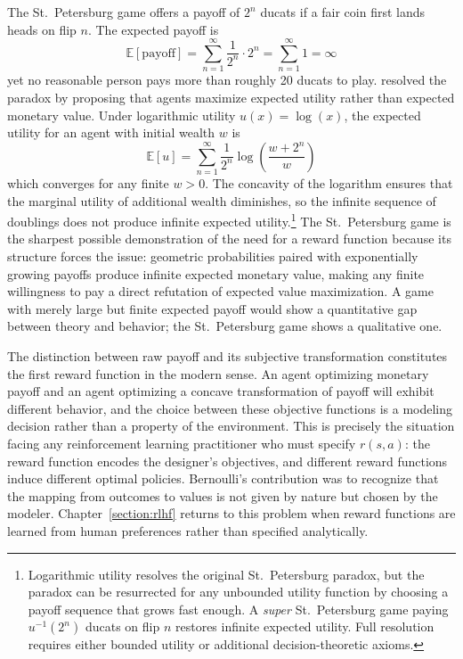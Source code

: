 The St.\ Petersburg game offers a payoff of $2^n$ ducats if a fair coin first lands heads on flip $n$. The expected payoff is
\begin{equation}
\mathbb{E}[\text{payoff}] = \sum_{n=1}^{\infty} \frac{1}{2^n} \cdot 2^n = \sum_{n=1}^{\infty} 1 = \infty
\end{equation}
yet no reasonable person pays more than roughly 20 ducats to play. \citet{Bernoulli1738} resolved the paradox by proposing that agents maximize expected utility rather than expected monetary value. Under logarithmic utility $u(x) = \log(x)$, the expected utility for an agent with initial wealth $w$ is
\begin{equation}
\mathbb{E}[u] = \sum_{n=1}^{\infty} \frac{1}{2^n} \log\!\left(\frac{w + 2^n}{w}\right)
\end{equation}
which converges for any finite $w > 0$. The concavity of the logarithm ensures that the marginal utility of additional wealth diminishes, so the infinite sequence of doublings does not produce infinite expected utility.\footnote{Logarithmic utility resolves the original St.\ Petersburg paradox, but the paradox can be resurrected for any unbounded utility function by choosing a payoff sequence that grows fast enough. A \emph{super} St.\ Petersburg game paying $u^{-1}(2^n)$ ducats on flip $n$ restores infinite expected utility. Full resolution requires either bounded utility or additional decision-theoretic axioms.} The St.\ Petersburg game is the sharpest possible demonstration of the need for a reward function because its structure forces the issue: geometric probabilities paired with exponentially growing payoffs produce infinite expected monetary value, making any finite willingness to pay a direct refutation of expected value maximization. A game with merely large but finite expected payoff would show a quantitative gap between theory and behavior; the St.\ Petersburg game shows a qualitative one.

The distinction between raw payoff and its subjective transformation constitutes the first reward function in the modern sense. An agent optimizing monetary payoff and an agent optimizing a concave transformation of payoff will exhibit different behavior, and the choice between these objective functions is a modeling decision rather than a property of the environment. This is precisely the situation facing any reinforcement learning practitioner who must specify $r(s,a)$: the reward function encodes the designer's objectives, and different reward functions induce different optimal policies. Bernoulli's contribution was to recognize that the mapping from outcomes to values is not given by nature but chosen by the modeler. Chapter~\ref{section:rlhf} returns to this problem when reward functions are learned from human preferences rather than specified analytically.

